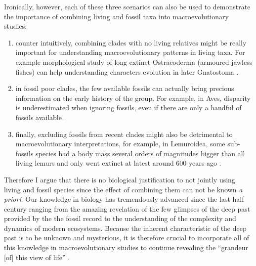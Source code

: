 Ironically, however, each of these three scenarios can also be used to demonstrate the importance of combining living and fossil taxa into macroevolutionary studies:
\begin{enumerate}
\item counter intuitively, combining clades with no living relatives might be really important for understanding macroevolutionary patterns in living taxa. For example morphological study of long extinct Ostracoderma (armoured jawless fishes) can help understanding characters evolution in later Gnatostoma \citep[jawed vertebrates;][]{Janvier2015}.
\item in fossil poor clades, the few available fossils can actually bring precious information on the early history of the group. For example, in Aves, disparity is underestimated when ignoring fossils, even if there are only a handful of fossils available \citep[e.g. 58 fossil genera against 604 living ones;][]{Mitchell2015}.
\item finally, excluding fossils from recent clades might also be detrimental to macroevolutionary interpretations, for example, in Lemuroidea, some sub-fossils species had a body mass several orders of magnitudes bigger than all living lemurs \citep{hartwig2002primate,Jungers2008} and only went extinct at latest around 600 years ago \citep{goodman2003introduction}.
\end{enumerate}

Therefore I argue that there is no biological justification to not jointly using living and fossil species since the effect of combining them can not be known \textit{a priori}.
Our knowledge in biology has tremendously advanced since the last half century ranging from the amazing revelation of the few glimpses of the deep past provided by the the fossil record to the understanding of the complexity and dynamics of modern ecosystems.
Because the inherent characteristic of the deep past is to be unknown and mysterious, it is therefore crucial to incorporate all of this knowledge in macroevolutionary studies to continue revealing the ``grandeur [of] this view of life'' \citep{darwin}.

%
